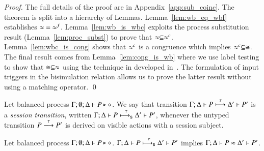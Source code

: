 \begin{proof}
	The full details of the proof are in Appendix~\ref{app:sub_coinc}.
	The theorem is split into a hierarchy of Lemmas. 
	Lemma~\ref{lem:wb_eq_wbf} establishes $\approx\ =\ \approx^{f}$.
	Lemma~\ref{lem:wb_is_wbc} exploits the process substitution result
	(Lemma~\ref{lem:proc_subst}) to prove that $\approx \subseteq \approx^{c}$.
	Lemma~\ref{lem:wbc_is_cong} shows that $\approx^{c}$ is a congruence
	which implies $\approx^{c} \subseteq \cong$.
	The final result comes from Lemma~\ref{lem:cong_is_wb} where
	we use label testing to show that $\cong \subseteq \approx$ using
	the technique in developed in~\cite{Hennessy07}. The formulation of input
	triggers in the bisimulation relation allows us to prove
	the latter result without using a matching operator.
	\qed
\end{proof}

%

\begin{definition}\rm
	Let balanced \HOp process $\Gamma; \emptyset; \Delta \vdash P \triangleright \diamond$.
	We say that transition
	$\Gamma; \Delta \vdash P \stackrel{\tau}{\longmapsto} \Delta' \vdash P'$ is
	a {\em session transition}, written
	$\Gamma; \Delta \vdash P \stackrel{\tau}{\longmapsto_{\mathsf{s}}} \Delta' \vdash P'$,
	whenever the untyped transition $P \stackrel{\tau}{\longrightarrow} P'$
	is derived on visible actions with a session subject.
\end{definition}

\begin{proposition}\rm
	\label{lem:tau_inert}
	Let balanced \HOp process $\Gamma; \emptyset; \Delta \vdash P \triangleright \diamond$.
	$\Gamma; \Delta \vdash P \stackrel{\tau}{\longmapsto_{\mathsf{s}}} \Delta' \vdash P'$ implies
	$\Gamma; \Delta \vdash P \approx \Delta' \vdash P'$.
\end{proposition}

